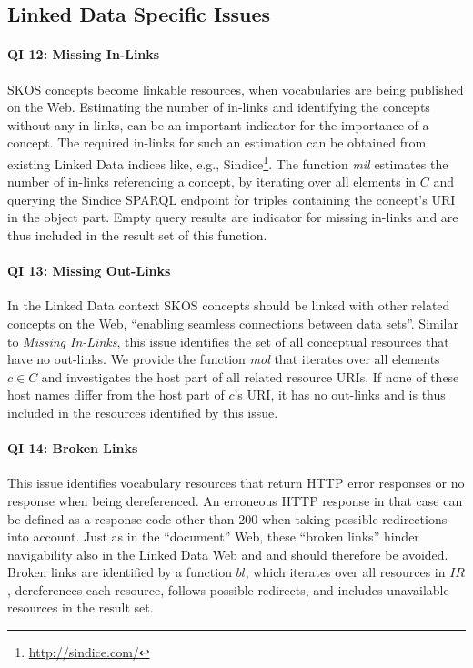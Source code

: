 
\subsection{Linked Data Specific Issues}

\paragraph{QI 12: Missing In-Links}

SKOS concepts become linkable resources, when vocabularies are being published on the Web. Estimating the number of in-links and identifying the concepts without any in-links, can be an important indicator for the importance of a concept. The required in-links for such an estimation can be obtained from existing Linked Data indices like, e.g., Sindice\footnote{\url{http://sindice.com/}}. 
The function \textit{mil} estimates the number of in-links referencing a concept, by iterating over all elements in $C$ and querying the Sindice SPARQL endpoint for triples containing the concept's URI in the object part. Empty query results are indicator for missing  in-links and are thus included in the result set of this function.

\paragraph{QI 13: Missing Out-Links}

In the Linked Data context SKOS concepts should be linked with other related concepts on the Web, ``enabling seamless connections between data sets''\cite{Heath2011}. Similar to \emph{Missing In-Links}, this issue identifies the set of all conceptual resources that have no out-links. 
We provide the function \textit{mol} that iterates over all elements $c \in C$ and investigates  the host part of all related resource URIs. If none of these host names differ from the host part of $c$'s URI, it has no out-links and is thus included in the resources identified by this issue.

\paragraph{QI 14: Broken Links}

This issue identifies vocabulary resources that return HTTP error responses or no response when being dereferenced. An erroneous HTTP response in that case can be defined as a response code other than 200 when taking possible redirections into account. Just as in the ``document'' Web, these ``broken links'' hinder navigability also in the Linked Data Web and and should therefore be avoided. 
Broken links are identified by a function $bl$, which iterates over all resources in $IR$, dereferences each resource, follows possible redirects, and includes unavailable resources in the result set.


